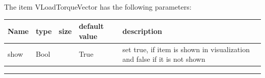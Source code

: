 The item VLoadTorqueVector has the following parameters:\vspace{-1cm}\\ 
\begin{center}
  \footnotesize
  \begin{longtable}{| p{4.5cm} | p{2.5cm} | p{0.5cm} | p{2.5cm} | p{6cm} |}
    \hline
    \bf Name & \bf type & \bf size & \bf default value & \bf description \\ \hline
    show &     Bool &      &     True &     set true, if item is shown in visualization and false if it is not shown\\ \hline
	  \end{longtable}
	\end{center}
\par\noindent\rule{\textwidth}{0.4pt}
\label{description_LoadTorqueVector}
